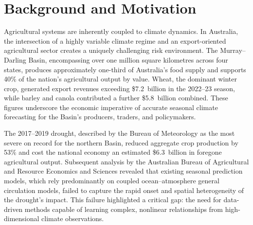 \section{Background and Motivation}

Agricultural systems are inherently coupled to climate dynamics. In Australia,
the intersection of a highly variable climate regime and an export-oriented
agricultural sector creates a uniquely challenging risk environment. The
Murray--Darling Basin, encompassing over one million square kilometres across
four states, produces approximately one-third of Australia's food supply and
supports 40\% of the nation's agricultural output by value. Wheat, the dominant
winter crop, generated export revenues exceeding \$7.2~billion in the 2022--23
season, while barley and canola contributed a further \$5.8~billion combined.
These figures underscore the economic imperative of accurate seasonal climate
forecasting for the Basin's producers, traders, and policymakers.

The 2017--2019 drought, described by the Bureau of Meteorology as the most
severe on record for the northern Basin, reduced aggregate crop production by
53\% and cost the national economy an estimated \$6.3~billion in foregone
agricultural output. Subsequent analysis by the Australian Bureau of
Agricultural and Resource Economics and Sciences revealed that existing
seasonal prediction models, which rely predominantly on coupled ocean--atmosphere
general circulation models, failed to capture the rapid onset and spatial
heterogeneity of the drought's impact. This failure highlighted a critical gap:
the need for data-driven methods capable of learning complex, nonlinear
relationships from high-dimensional climate observations.

